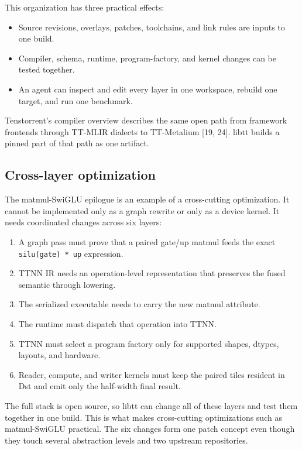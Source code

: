 \documentclass[
  10pt,
  american,
  10pt,
  letterpaper]{article}
\providecommand{\tightlist}{%
  \setlength{\itemsep}{0pt}\setlength{\parskip}{0pt}}
\begin{document}
This organization has three practical effects:

\begin{itemize}
\tightlist
\item
  Source revisions, overlays, patches, toolchains, and link rules are
  inputs to one build.
\item
  Compiler, schema, runtime, program-factory, and kernel changes can be
  tested together.
\item
  An agent can inspect and edit every layer in one workspace, rebuild
  one target, and run one benchmark.
\end{itemize}

Tenstorrent's compiler overview describes the same open path from
framework frontends through TT-MLIR dialects to TT-Metalium {[}19,
24{]}. libtt builds a pinned part of that path as one artifact.

\hypertarget{cross-layer-optimization}{%
\subsection{Cross-layer optimization}\label{cross-layer-optimization}}

The matmul-SwiGLU epilogue is an example of a cross-cutting
optimization. It cannot be implemented only as a graph rewrite or only
as a device kernel. It needs coordinated changes across six layers:

\begin{enumerate}
\def\labelenumi{\arabic{enumi}.}
\tightlist
\item
  A graph pass must prove that a paired gate/up matmul feeds the exact
  \texttt{silu(gate)\ *\ up} expression.
\item
  TTNN IR needs an operation-level representation that preserves the
  fused semantic through lowering.
\item
  The serialized executable needs to carry the new matmul attribute.
\item
  The runtime must dispatch that operation into TTNN.
\item
  TTNN must select a program factory only for supported shapes, dtypes,
  layouts, and hardware.
\item
  Reader, compute, and writer kernels must keep the paired tiles
  resident in Dst and emit only the half-width final result.
\end{enumerate}

The full stack is open source, so libtt can change all of these layers
and test them together in one build. This is what makes cross-cutting
optimizations such as matmul-SwiGLU practical. The six changes form one
patch concept even though they touch several abstraction levels and two
upstream repositories.
\end{document}
